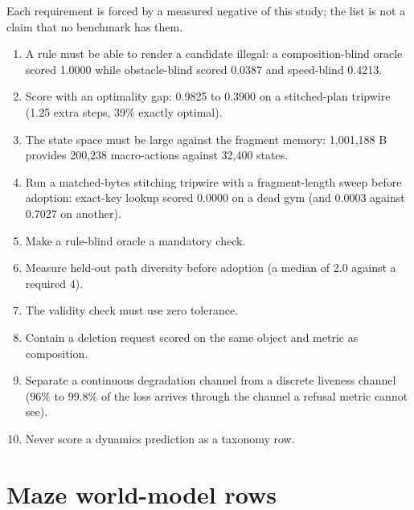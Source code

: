 \documentclass{article} %
\begin{document}
Each requirement is forced by a measured negative of this study; the list is not a claim that
no benchmark has them. %
\begin{enumerate}
\item A rule must be able to render a candidate illegal: a composition-blind oracle scored 1.0000
  while obstacle-blind scored 0.0387 and speed-blind 0.4213. %
\item Score with an optimality gap: 0.9825 to 0.3900 on a stitched-plan tripwire (1.25 extra steps,
  39\% exactly optimal). %
\item The state space must be large against the fragment memory: 1,001,188 B provides 200,238
  macro-actions against 32,400 states. %
\item Run a matched-bytes stitching tripwire with a fragment-length sweep before adoption: exact-key
  lookup scored 0.0000 on a dead gym (and 0.0003 against 0.7027 on another).
\item Make a rule-blind oracle a mandatory check.
\item Measure held-out path diversity before adoption (a median of 2.0 against a required 4).
\item The validity check must use zero tolerance.
\item Contain a deletion request scored on the same object and metric as composition.
\item Separate a continuous degradation channel from a discrete liveness channel (96\% to 99.8\% of
  the loss arrives through the channel a refusal metric cannot see). %
\item Never score a dynamics prediction as a taxonomy row.
\end{enumerate}

\section{Maze world-model rows}
\label{app:mazewm}
\end{document}
